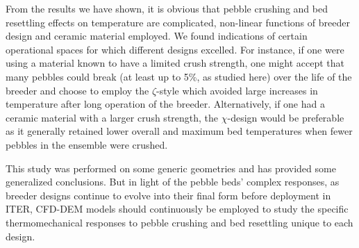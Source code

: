 From the results we have shown, it is obvious that pebble crushing and bed resettling effects on temperature are complicated, non-linear functions of breeder design and ceramic material employed. We found indications of certain operational spaces for which different designs excelled. For instance, if one were using a material known to have a limited crush strength, one might accept that many pebbles could break (at least up to 5\%, as studied here) over the life of the breeder and choose to employ the $\zeta$-style which avoided large increases in temperature after long operation of the breeder. Alternatively, if one had a ceramic material with a larger crush strength, the $\chi$-design would be preferable as it generally retained lower overall and maximum bed temperatures when fewer pebbles in the ensemble were crushed.

This study was performed on some generic geometries and has provided some generalized conclusions. But in light of the pebble beds' complex responses, as breeder designs continue to evolve into their final form before deployment in ITER, CFD-DEM models should continuously be employed to study the specific thermomechanical responses to pebble crushing and bed resettling unique to each design.









\FloatBarrier
